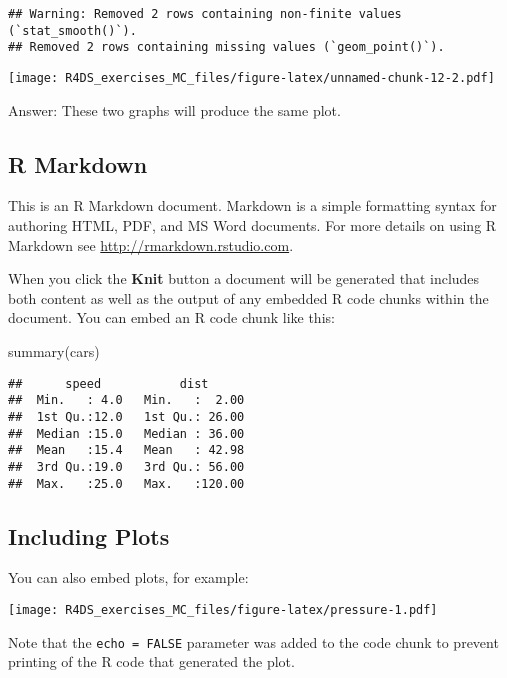 \documentclass[
]{article}
\newenvironment{Shaded}{\begin{snugshade}}{\end{snugshade}}
\newcommand{\FunctionTok}[1]{\textcolor[rgb]{0.00,0.00,0.00}{#1}}
\newcommand{\NormalTok}[1]{#1}
\begin{document}
\begin{verbatim}
## Warning: Removed 2 rows containing non-finite values (`stat_smooth()`).
## Removed 2 rows containing missing values (`geom_point()`).
\end{verbatim}

\texttt{[image: R4DS\_exercises\_MC\_files/figure-latex/unnamed-chunk-12-2.pdf]}

Answer: These two graphs will produce the same plot.

\hypertarget{r-markdown}{%
\subsection{R Markdown}\label{r-markdown}}

This is an R Markdown document. Markdown is a simple formatting syntax
for authoring HTML, PDF, and MS Word documents. For more details on
using R Markdown see \url{http://rmarkdown.rstudio.com}.

When you click the \textbf{Knit} button a document will be generated
that includes both content as well as the output of any embedded R code
chunks within the document. You can embed an R code chunk like this:

\begin{Shaded}
\begin{Highlighting}[]
\FunctionTok{summary}\NormalTok{(cars)}
\end{Highlighting}
\end{Shaded}

\begin{verbatim}
##      speed           dist       
##  Min.   : 4.0   Min.   :  2.00  
##  1st Qu.:12.0   1st Qu.: 26.00  
##  Median :15.0   Median : 36.00  
##  Mean   :15.4   Mean   : 42.98  
##  3rd Qu.:19.0   3rd Qu.: 56.00  
##  Max.   :25.0   Max.   :120.00
\end{verbatim}

\hypertarget{including-plots}{%
\subsection{Including Plots}\label{including-plots}}

You can also embed plots, for example:

\texttt{[image: R4DS\_exercises\_MC\_files/figure-latex/pressure-1.pdf]}

Note that the \texttt{echo\ =\ FALSE} parameter was added to the code
chunk to prevent printing of the R code that generated the plot.
\end{document}
